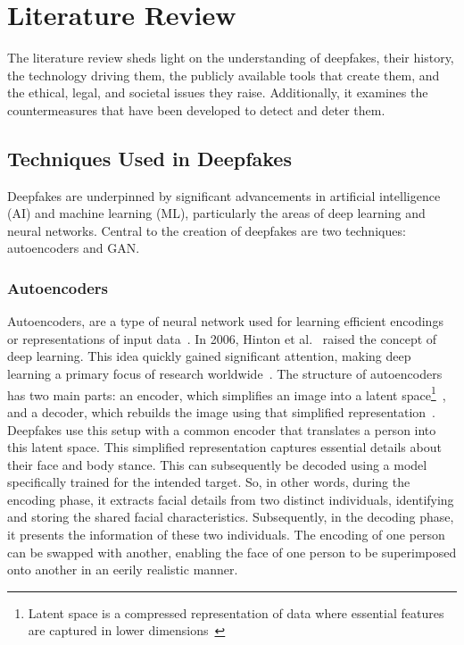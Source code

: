 
\chapter{Literature Review}\label{chapter:literature}
The literature review sheds light on the understanding of deepfakes, their history,
the technology driving them, the publicly available tools that create them, and
the ethical, legal, and societal issues they raise. Additionally, it examines the
countermeasures that have been developed to detect and deter them.

\section{Techniques Used in Deepfakes}\label{chapter:techniques}
Deepfakes are underpinned by significant advancements in artificial intelligence (\ac{AI})
and machine learning (ML), particularly the areas of deep learning and neural
networks. Central to the creation of deepfakes are two techniques:
autoencoders and \ac{GAN}.

\subsection{Autoencoders}
Autoencoders, are a type of neural network used for learning
efficient encodings or representations of input data~\cite{doi:10.1126/science.1127647}.
In 2006, Hinton et al.~\cite{10.1145/3297156.3297210,doi:10.1126/science.1127647}
raised the concept of deep learning. This idea quickly gained significant attention,
making deep learning a primary focus of research worldwide~\cite{simonyan2015deep}.
The structure of autoencoders has two main parts: an encoder, which simplifies an
image into a latent space\footnote{Latent space is a compressed representation of data where essential
	features are captured in lower dimensions~\cite{latent-space}}~\cite{latent-space-medium}, and a decoder,
which rebuilds the image using that simplified representation~\cite{latent-space-medium,wikipedia-deepfakes}. Deepfakes use this
setup with a common encoder that translates a person into this latent space. This simplified
representation captures essential details about their face and body stance. This can subsequently
be decoded using a model specifically trained for the intended target. So, in other words,
during the encoding phase, it extracts facial details from two distinct individuals,
identifying and storing the shared facial characteristics. Subsequently, in the decoding phase,
it presents the information of these two individuals. The encoding of one person can be
swapped with another, enabling the face of one person to be superimposed onto another
in an eerily realistic manner.

